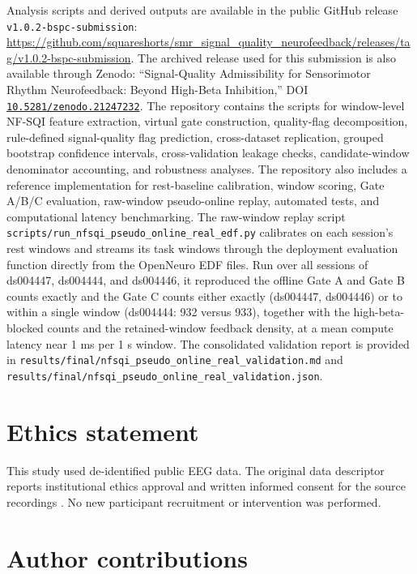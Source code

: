 \documentclass[preprint,12pt]{elsarticle}
\newcommand{\doiurl}[1]{\href{https://doi.org/#1}{\nolinkurl{#1}}}
\begin{document}
Analysis scripts and derived outputs are available in the public GitHub release \texttt{v1.0.2-bspc-submission}: \url{https://github.com/squareshorts/smr_signal_quality_neurofeedback/releases/tag/v1.0.2-bspc-submission}. The archived release used for this submission is also available through Zenodo: ``Signal-Quality Admissibility for Sensorimotor Rhythm Neurofeedback: Beyond High-Beta Inhibition,'' DOI \doiurl{10.5281/zenodo.21247232}. The repository contains the scripts for window-level NF-SQI feature extraction, virtual gate construction, quality-flag decomposition, rule-defined signal-quality flag prediction, cross-dataset replication, grouped bootstrap confidence intervals, cross-validation leakage checks, candidate-window denominator accounting, and robustness analyses. The repository also includes a reference implementation for rest-baseline calibration, window scoring, Gate A/B/C evaluation, raw-window pseudo-online replay, automated tests, and computational latency benchmarking. The raw-window replay script \texttt{scripts/run\_nfsqi\_pseudo\_online\_real\_edf.py} calibrates on each session's rest windows and streams its task windows through the deployment evaluation function directly from the OpenNeuro EDF files. Run over all sessions of ds004447, ds004444, and ds004446, it reproduced the offline Gate A and Gate B counts exactly and the Gate C counts either exactly (ds004447, ds004446) or to within a single window (ds004444: 932 versus 933), together with the high-beta-blocked counts and the retained-window feedback density, at a mean compute latency near 1 ms per 1 s window. The consolidated validation report is provided in \texttt{results/final/nfsqi\_pseudo\_online\_real\_validation.md} and \texttt{results/final/nfsqi\_pseudo\_online\_real\_validation.json}.

\section*{Ethics statement}

This study used de-identified public EEG data. The original data descriptor reports institutional ethics approval and written informed consent for the source recordings \citep{Iwama2023HDEEG}. No new participant recruitment or intervention was performed.

\section*{Author contributions}
\end{document}
